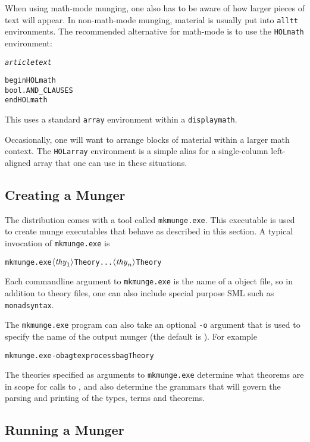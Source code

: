 When using math-mode munging, one also has to be aware of how larger pieces of text will appear.
In non-math-mode munging, material is usually put into \texttt{alltt} environments.
The recommended alternative for math-mode is to use the \texttt{\bs{}HOLmath} environment:
\begin{alltt}
   \textit{article text}

   \bs{}begin\lb{}HOLmath\rb
   \holthm\lb{}bool.AND_CLAUSES\rb
   \bs{}end\lb{}HOLmath\rb
\end{alltt}
This uses a standard \texttt{array} environment within a \texttt{displaymath}.

Occasionally, one will want to arrange blocks of \HOL{} material within a larger math context.
The \texttt{HOLarray} environment is a simple alias for a single-column left-aligned array that one can use in these situations.


\subsection{Creating a Munger}
\label{sec:munger-creation}

\newcommand{\mkmunge}{\texttt{mkmunge.exe}}
%
The \HOL{} distribution comes with a tool called \mkmunge.
%
This executable is used to create munge executables that behave as described in this section.
%
A typical invocation of \mkmunge{} is
\begin{alltt}
   \mkmunge \(\langle\mathit{thy}\sb{1}\rangle\)Theory ... \(\langle\mathit{thy}\sb{n}\rangle\)Theory
\end{alltt}
Each commandline argument to \mkmunge{} is the name of a \HOL{} object file, so in addition to theory files, one can also include special purpose SML such as \texttt{monadsyntax}.

The \mkmunge{} program can also take an optional \texttt{-o} argument that is used to specify the name of the output munger (the default is \munge).  For example
\begin{alltt}
   \mkmunge -o bagtexprocess bagTheory
\end{alltt}

The theories specified as arguments to \mkmunge{} determine what theorems are in scope for calls to \holthm, and also determine the grammars that will govern the parsing and printing of the \HOL{} types, terms and theorems.


\subsection{Running a Munger}
\label{sec:running-munger}

